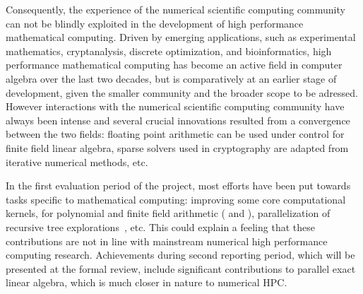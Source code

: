 Consequently, the experience of the numerical scientific computing community can not
be blindly exploited in the development of high performance mathematical
computing.
Driven by emerging applications, such as experimental mathematics, cryptanalysis,
discrete optimization, and bioinformatics, high performance mathematical computing has
become an active field in computer algebra over the last two decades, but is
comparatively at an earlier stage of development, given the smaller community
and the broader scope to be adressed.
However interactions with the numerical scientific computing community
have always been intense and several crucial innovations
resulted from a convergence between the two fields: floating point arithmetic
can be used under control for finite field linear algebra, sparse solvers used
in cryptography are adapted from iterative numerical methods, etc.

In the first evaluation period of the project, most efforts have been put
towards tasks specific to mathematical computing: improving some core computational kernels, for polynomial and finite
field arithmetic (  and ),
parallelization of recursive tree explorations~, etc. This could explain a
feeling that these contributions are not in line with mainstream numerical high
performance computing research.
Achievements during second reporting period, which will be presented
at the formal review, include significant contributions to parallel
exact linear algebra, which is much closer in nature to numerical HPC.

